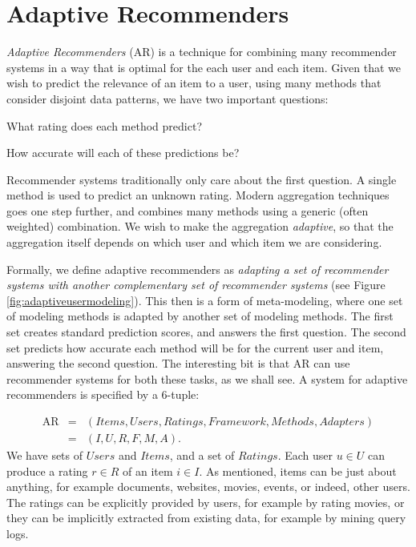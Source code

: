 \section{Adaptive Recommenders}
\label{sec:usermetamodeling}

\emph{Adaptive Recommenders} (AR) is a technique for combining many recommender systems
in a way that is optimal for the each user and each item.
Given that we wish to predict the relevance of an item to a user,
using many methods that consider disjoint data patterns,
we have two important questions:

\begin{enumerate*}
  \item What rating does each method predict?
  \item How accurate will each of these predictions be?
\end{enumerate*}

Recommender systems traditionally only care about the first question.
A single method is used to predict an unknown rating.
Modern aggregation techniques goes one step further, and combines many methods using a generic (often weighted) combination.
We wish to make the aggregation \emph{adaptive},
so that the aggregation itself depends on which user and which item we are considering.

Formally, we define adaptive recommenders as \emph{adapting a set of recommender systems
with another complementary set of recommender systems} 
(see Figure \ref{fig:adaptiveusermodeling}).
This then is a form of meta-modeling, where one set of modeling methods is adapted by another set of modeling methods.
The first set creates standard prediction scores, and answers the first question.
The second set predicts how accurate each method will be for the current user and item,
answering the second question.
The interesting bit is that AR can use recommender systems for both these tasks, as we shall see.
A system for adaptive recommenders is specified by a 6-tuple:

\begin{eqnarray*}
  \mathrm{AR} &=& (Items, Users, Ratings, Framework, Methods, Adapters)\\
              &=& (I,U,R,F,M,A).
\end{eqnarray*}
%
We have sets of $Users$ and $Items$, and a set of $Ratings$.
Each user $u \in U$ can produce a rating $r \in R$ of an item $i \in I$.
As mentioned, items can be just about anything, for example documents, websites, movies, events, or indeed, other users.
The ratings can be explicitly provided by users, for example by rating movies,
or they can be implicitly extracted from existing data, for example by mining query logs.

